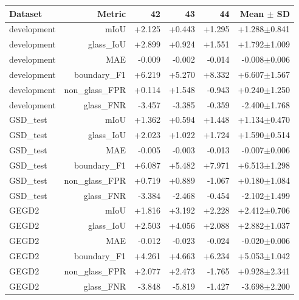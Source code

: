 \par\medskip\noindent\begin{minipage}{\linewidth}
\centering\footnotesize\setlength{\tabcolsep}{3pt}
\label{tab:fullpaired}
\begin{tabular}{lrrrrr}
\toprule
Dataset & Metric & 42 & 43 & 44 & Mean $\pm$ SD\\\midrule
development & mIoU & +2.125 & +0.443 & +1.295 & +1.288$\pm$0.841\\
development & glass\_IoU & +2.899 & +0.924 & +1.551 & +1.792$\pm$1.009\\
development & MAE & -0.009 & -0.002 & -0.014 & -0.008$\pm$0.006\\
development & boundary\_F1 & +6.219 & +5.270 & +8.332 & +6.607$\pm$1.567\\
development & non\_glass\_FPR & +0.114 & +1.548 & -0.943 & +0.240$\pm$1.250\\
development & glass\_FNR & -3.457 & -3.385 & -0.359 & -2.400$\pm$1.768\\
GSD\_test & mIoU & +1.362 & +0.594 & +1.448 & +1.134$\pm$0.470\\
GSD\_test & glass\_IoU & +2.023 & +1.022 & +1.724 & +1.590$\pm$0.514\\
GSD\_test & MAE & -0.005 & -0.003 & -0.013 & -0.007$\pm$0.006\\
GSD\_test & boundary\_F1 & +6.087 & +5.482 & +7.971 & +6.513$\pm$1.298\\
GSD\_test & non\_glass\_FPR & +0.719 & +0.889 & -1.067 & +0.180$\pm$1.084\\
GSD\_test & glass\_FNR & -3.384 & -2.468 & -0.454 & -2.102$\pm$1.499\\
GEGD2 & mIoU & +1.816 & +3.192 & +2.228 & +2.412$\pm$0.706\\
GEGD2 & glass\_IoU & +2.503 & +4.056 & +2.088 & +2.882$\pm$1.037\\
GEGD2 & MAE & -0.012 & -0.023 & -0.024 & -0.020$\pm$0.006\\
GEGD2 & boundary\_F1 & +4.261 & +4.663 & +6.234 & +5.053$\pm$1.042\\
GEGD2 & non\_glass\_FPR & +2.077 & +2.473 & -1.765 & +0.928$\pm$2.341\\
GEGD2 & glass\_FNR & -3.848 & -5.819 & -1.427 & -3.698$\pm$2.200\\
\bottomrule\end{tabular}
\end{minipage}\par\medskip
